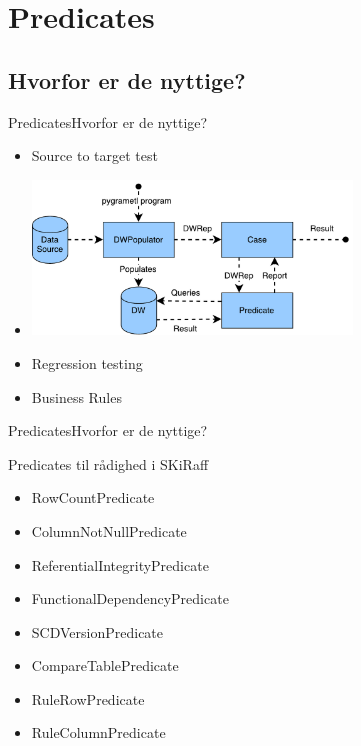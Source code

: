 
\section{Predicates}
\subsection{Hvorfor er de nyttige?}
\begin{frame}{Predicates}{Hvorfor er de nyttige?}
	\begin{itemize}
		\item<1-> Source to target test
		\item<1->[] \includegraphics[width=8.5cm]{figures/overview.pdf}
		\item<2-> Regression testing
		\item<3-> Business Rules
	\end{itemize}
\end{frame}

\begin{frame}{Predicates}{Hvorfor er de nyttige?}
	\begin{block}{Predicates til rådighed i SKiRaff}
		\begin{itemize}
			\item<1-> RowCountPredicate
			\item<1-> ColumnNotNullPredicate
			\item<1-> ReferentialIntegrityPredicate
			\item<1-> FunctionalDependencyPredicate
			\item<1-> SCDVersionPredicate
			\item<1-> CompareTablePredicate
			\item<1-> RuleRowPredicate
			\item<1-> RuleColumnPredicate
		\end{itemize}
	\end{block}
\end{frame}

